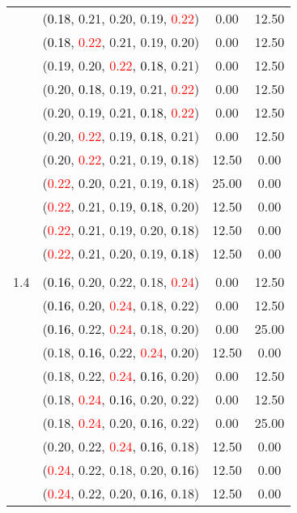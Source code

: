 \documentclass[10pt,a4paper]{report}
\begin{document}
\begin{center}
\begin{longtable}{clcc}
			&(\textcolor{black}{0.18}, 0.21, 0.20, 0.19, \textcolor{red}{0.22})&0.00&12.50\\
			&(\textcolor{black}{0.18}, \textcolor{red}{0.22}, 0.21, 0.19, 0.20)&0.00&12.50\\
			&(0.19, 0.20, \textcolor{red}{0.22}, \textcolor{black}{0.18}, 0.21)&0.00&12.50\\
			&(0.20, \textcolor{black}{0.18}, 0.19, 0.21, \textcolor{red}{0.22})&0.00&12.50\\
			&(0.20, 0.19, 0.21, \textcolor{black}{0.18}, \textcolor{red}{0.22})&0.00&12.50\\
			&(0.20, \textcolor{red}{0.22}, 0.19, \textcolor{black}{0.18}, 0.21)&0.00&12.50\\
			&(0.20, \textcolor{red}{0.22}, 0.21, 0.19, \textcolor{black}{0.18})&12.50&0.00\\
			&(\textcolor{red}{0.22}, 0.20, 0.21, 0.19, \textcolor{black}{0.18})&25.00&0.00\\
			&(\textcolor{red}{0.22}, 0.21, 0.19, \textcolor{black}{0.18}, 0.20)&12.50&0.00\\
			&(\textcolor{red}{0.22}, 0.21, 0.19, 0.20, \textcolor{black}{0.18})&12.50&0.00\\
			&(\textcolor{red}{0.22}, 0.21, 0.20, 0.19, \textcolor{black}{0.18})&12.50&0.00\\
		&&&\\
		1.4			&(\textcolor{black}{0.16}, 0.20, 0.22, 0.18, \textcolor{red}{0.24})&0.00&12.50\\
			&(\textcolor{black}{0.16}, 0.20, \textcolor{red}{0.24}, 0.18, 0.22)&0.00&12.50\\
			&(\textcolor{black}{0.16}, 0.22, \textcolor{red}{0.24}, 0.18, 0.20)&0.00&25.00\\
			&(0.18, \textcolor{black}{0.16}, 0.22, \textcolor{red}{0.24}, 0.20)&12.50&0.00\\
			&(0.18, 0.22, \textcolor{red}{0.24}, \textcolor{black}{0.16}, 0.20)&0.00&12.50\\
			&(0.18, \textcolor{red}{0.24}, \textcolor{black}{0.16}, 0.20, 0.22)&0.00&12.50\\
			&(0.18, \textcolor{red}{0.24}, 0.20, \textcolor{black}{0.16}, 0.22)&0.00&25.00\\
			&(0.20, 0.22, \textcolor{red}{0.24}, \textcolor{black}{0.16}, 0.18)&12.50&0.00\\
			&(\textcolor{red}{0.24}, 0.22, 0.18, 0.20, \textcolor{black}{0.16})&12.50&0.00\\
			&(\textcolor{red}{0.24}, 0.22, 0.20, \textcolor{black}{0.16}, 0.18)&12.50&0.00\\

\end{longtable}
\end{center}
\end{document}
